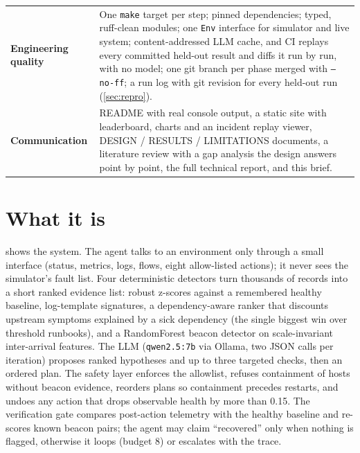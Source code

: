 \documentclass[11pt,a4paper]{article}
\newcommand{\code}[1]{\texttt{#1}}
\begin{document}
\begin{table}[H]
\begin{tabularx}{\textwidth}{>{\bfseries\color{accent}}p{3.1cm} X}
Engineering quality & One \code{make} target per step; pinned dependencies; typed, ruff-clean modules; one \code{Env} interface for simulator and live system; content-addressed LLM cache, and CI replays every committed held-out result and diffs it run by run, with no model; one git branch per phase merged with \code{--no-ff}; a run log with git revision for every held-out run (\cref{sec:repro}). \\
Communication & README with real console output, a static site with leaderboard, charts and an incident replay viewer, DESIGN / RESULTS / LIMITATIONS documents, a literature review with a gap analysis the design answers point by point, the full technical report, and this brief. \\
\bottomrule
\end{tabularx}
\end{table}

\section{What it is}
\label{sec:design}

 shows the system. The agent talks to an environment only through a small
interface (status, metrics, logs, flows, eight allow-listed actions); it never sees the
simulator's fault list. Four deterministic detectors turn thousands of records into a short ranked
evidence list: robust z-scores against a remembered healthy baseline, log-template signatures, a
dependency-aware ranker that discounts upstream symptoms explained by a sick dependency (the single
biggest win over threshold runbooks), and a RandomForest beacon detector on scale-invariant
inter-arrival features. The LLM (\code{qwen2.5:7b} via Ollama, two JSON calls per iteration)
proposes ranked hypotheses and up to three targeted checks, then an ordered plan. The safety
layer enforces the allowlist, refuses containment of hosts without beacon evidence, reorders plans
so containment precedes restarts, and undoes any action that drops observable health by more than
0.15. The verification gate compares post-action telemetry with the healthy baseline and re-scores
known beacon pairs; the agent may claim ``recovered'' only when nothing is flagged, otherwise it
loops (budget 8) or escalates with the trace.
\end{document}
